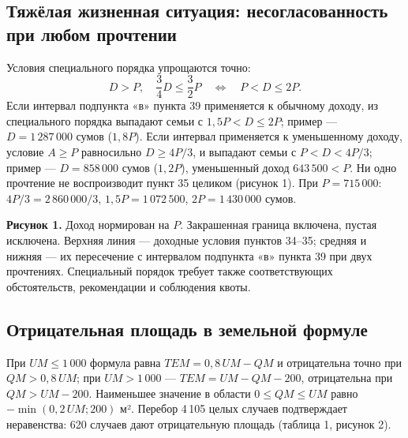 \documentclass[12pt,a4paper]{extarticle}
\begin{document}
\subsection{Тяжёлая жизненная ситуация: несогласованность при любом прочтении}
Условия специального порядка упрощаются точно:
\begin{equation}
D>P,\quad\frac34D\le\frac32P\quad\Longleftrightarrow\quad P<D\le2P.
\end{equation}
Если интервал подпункта «в» пункта 39 применяется к обычному доходу, из специального порядка выпадают семьи с $1{,}5P<D\le2P$; пример — $D=1\,287\,000$ сумов ($1{,}8P$). Если интервал применяется к уменьшенному доходу, условие $A\ge P$ равносильно $D\ge4P/3$, и выпадают семьи с $P<D<4P/3$; пример — $D=858\,000$ сумов ($1{,}2P$), уменьшенный доход $643\,500<P$. Ни одно прочтение не воспроизводит пункт 35 целиком (рисунок 1). При $P=715\,000$: $4P/3=2\,860\,000/3$, $1{,}5P=1\,072\,500$, $2P=1\,430\,000$ сумов.

\begin{center}\end{center}
\textbf{Рисунок 1.} Доход нормирован на $P$. Закрашенная граница включена, пустая исключена. Верхняя линия — доходные условия пунктов 34–35; средняя и нижняя — их пересечение с интервалом подпункта «в» пункта 39 при двух прочтениях. Специальный порядок требует также соответствующих обстоятельств, рекомендации и соблюдения квоты.

\subsection{Отрицательная площадь в земельной формуле}
При $UM\le1\,000$ формула равна $TEM=0{,}8\,UM-QM$ и отрицательна точно при $QM>0{,}8\,UM$; при $UM>1\,000$ — $TEM=UM-QM-200$, отрицательна при $QM>UM-200$. Наименьшее значение в области $0\le QM\le UM$ равно $-\min(0{,}2\,UM;200)$ м². Перебор 4\,105 целых случаев подтверждает неравенства: 620 случаев дают отрицательную площадь (таблица 1, рисунок 2).
\end{document}
